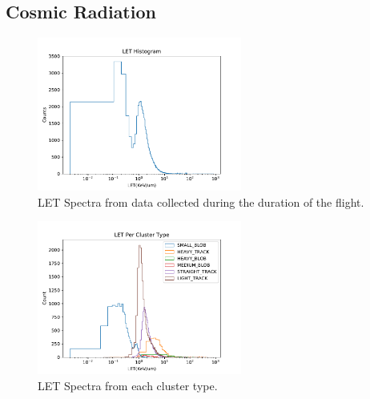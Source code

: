 \subsection{Cosmic Radiation}
\label{sec:Cosmic-Radiation-Results}

\begin{figure}[h!]
	\begin{center}
	\includegraphics[width=0.6\textwidth]{figures/LETSpectra2018.pdf}
	\caption{LET Spectra from data collected during the duration of the flight.}
	\label{fig:LETSpectra}
	\end{center}
\end{figure}

\begin{figure}[h!]
	\begin{center}
	\includegraphics[width=0.6\textwidth]{figures/LETSpectraPerCluster2018.pdf}
	\caption{LET Spectra from each cluster type.}
	\label{fig:LETSpectraCluster}
	\end{center}
\end{figure}
